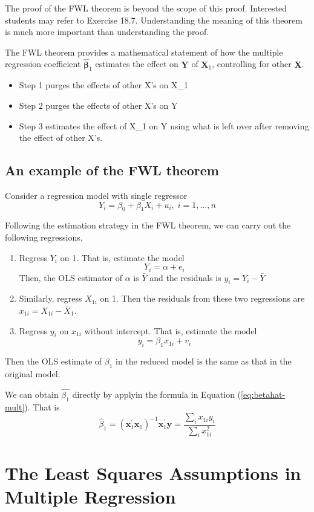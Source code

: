 \documentclass[a4paper,11pt]{article}
\begin{document}
The proof of the FWL theorem is beyond the scope of this
proof. Interested students may refer to Exercise 18.7.
Understanding the meaning of this theorem is much more important than
understanding the proof.

The FWL theorem provides a mathematical statement of how the multiple
regression coefficient \(\hat{\boldsymbol{\beta}}_1\) estimates the
effect on \(\mathbf{Y}\) of \(\mathbf{X}_1\), controlling for other
\(\mathbf{X}\).

\begin{itemize}
\item Step 1 purges the effects of other X's on X\_1
\item Step 2 purges the effects of other X's on Y
\item Step 3 estimates the effect of X\_1 on Y using what is left over
after removing the effect of other X's.
\end{itemize}

\subsection{An example of the FWL theorem}
\label{sec:org7dd771d}
Consider a regression model with single regressor
\[ Y_i = \beta_0 +
\beta_1 X_i + u_i,\; i=1, \ldots, n
\]

Following the estimation strategy in the FWL theorem, we can carry out the following regressions,
\begin{enumerate}
\item Regress \(Y_i\) on 1. That is, estimate the model
\[ Y_i = \alpha + e_i \]
Then, the OLS estimator of \(\alpha\) is
\(\bar{Y}\) and the residuals is \(y_i = Y_i - \bar{Y}\)
\item Similarly, regress \(X_{1i}\) on 1. Then
the residuals from these two regressions are \(x_{1i} = X_{1i} -
   \bar{X}_1\).
\item Regress \(y_i\) on \(x_{1i}\) without intercept. That is,
estimate the model
\[ y_i = \beta_1 x_{1i} + v_i \]
\end{enumerate}
Then the OLS estimate of \(\beta_1\) in the reduced model is the same as that in the original model.

We can obtain \(\hat{\beta_1}\) directly by applyin the formula in Equation (\ref{eq:betahat-mult}). That is
\[ \hat{\beta}_1 = (\mathbf{x}_1^{\prime} \mathbf{x}_1)^{-1} \mathbf{x}_1^{\prime} \mathbf{y} = \frac{\sum_i x_{1i} y_i}{\sum_i x_{1i}^2} \]

\section{The Least Squares Assumptions in Multiple Regression}
\label{sec:orgf8c2a77}
\end{document}

